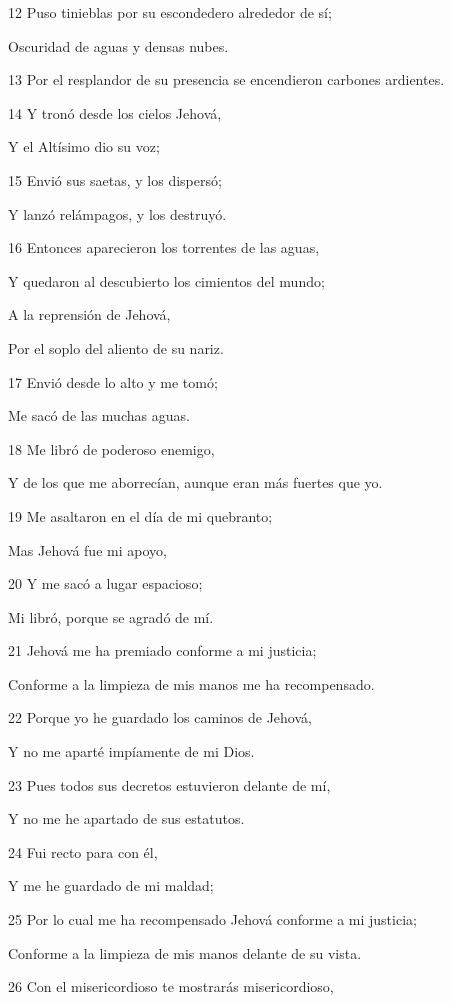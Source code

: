 \par 12 Puso tinieblas por su escondedero alrededor de sí;
\par Oscuridad de aguas y densas nubes.
\par 13 Por el resplandor de su presencia se encendieron carbones ardientes.
\par 14 Y tronó desde los cielos Jehová,
\par Y el Altísimo dio su voz;
\par 15 Envió sus saetas, y los dispersó;
\par Y lanzó relámpagos, y los destruyó.
\par 16 Entonces aparecieron los torrentes de las aguas,
\par Y quedaron al descubierto los cimientos del mundo;
\par A la reprensión de Jehová,
\par Por el soplo del aliento de su nariz.
\par 17 Envió desde lo alto y me tomó;
\par Me sacó de las muchas aguas.
\par 18 Me libró de poderoso enemigo,
\par Y de los que me aborrecían, aunque eran más fuertes que yo.
\par 19 Me asaltaron en el día de mi quebranto;
\par Mas Jehová fue mi apoyo,
\par 20 Y me sacó a lugar espacioso;
\par Mi libró, porque se agradó de mí.
\par 21 Jehová me ha premiado conforme a mi justicia;
\par Conforme a la limpieza de mis manos me ha recompensado.
\par 22 Porque yo he guardado los caminos de Jehová,
\par Y no me aparté impíamente de mi Dios.
\par 23 Pues todos sus decretos estuvieron delante de mí,
\par Y no me he apartado de sus estatutos.
\par 24 Fui recto para con él,
\par Y me he guardado de mi maldad;
\par 25 Por lo cual me ha recompensado Jehová conforme a mi justicia;
\par Conforme a la limpieza de mis manos delante de su vista.
\par 26 Con el misericordioso te mostrarás misericordioso,
